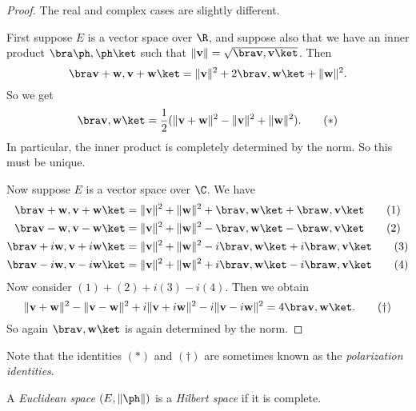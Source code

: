 \documentclass[a4paper]{article}
\begin{document}
\begin{proof}
  The real and complex cases are slightly different.

  First suppose $E$ is a vector space over $\R$, and suppose also that we have an inner product $\bra \ph,\ph\ket$ such that $\|\mathbf{v}\| = \sqrt{\bra \mathbf{v}, \mathbf{v}\ket }$. Then
  \[
    \bra \mathbf{v} + \mathbf{w}, \mathbf{v} + \mathbf{w}\ket = \|\mathbf{v}\|^2 + 2\bra \mathbf{v}, \mathbf{w}\ket + \|\mathbf{w}\|^2.
  \]
  So we get
  \[
    \bra \mathbf{v}, \mathbf{w}\ket = \frac{1}{2} (\|\mathbf{v} + \mathbf{w}\|^2 - \|\mathbf{v}\|^2 + \|\mathbf{w}\|^2).\tag{$*$}
  \]
  In particular, the inner product is completely determined by the norm. So this must be unique.

  Now suppose $E$ is a vector space over $\C$. We have
  \begin{align*}
    \bra \mathbf{v} + \mathbf{w}, \mathbf{v} + \mathbf{w}\ket &= \|\mathbf{v}\|^2 + \|\mathbf{w}\|^2 + \bra \mathbf{v}, \mathbf{w}\ket + \bra \mathbf{w}, \mathbf{v}\ket\tag{1}\\
    \bra \mathbf{v} - \mathbf{w}, \mathbf{v} - \mathbf{w}\ket &= \|\mathbf{v}\|^2 + \|\mathbf{w}\|^2 - \bra \mathbf{v}, \mathbf{w}\ket - \bra \mathbf{w}, \mathbf{v}\ket\tag{2}\\
    \bra \mathbf{v} +i\mathbf{w}, \mathbf{v} +i\mathbf{w}\ket &= \|\mathbf{v}\|^2 + \|\mathbf{w}\|^2 -i\bra \mathbf{v}, \mathbf{w}\ket +i\bra \mathbf{w}, \mathbf{v}\ket\tag{3}\\
    \bra \mathbf{v} -i\mathbf{w}, \mathbf{v} -i\mathbf{w}\ket &= \|\mathbf{v}\|^2 + \|\mathbf{w}\|^2 +i\bra \mathbf{v}, \mathbf{w}\ket -i\bra \mathbf{w}, \mathbf{v}\ket\tag{4}
  \end{align*}
  Now consider $(1) + (2) + i(3) - i(4)$. Then we obtain
  \[
    \|\mathbf{v} + \mathbf{w}\|^2 - \|\mathbf{v} - \mathbf{w}\|^2 + i\|\mathbf{v} + i\mathbf{w}\|^2 - i\|\mathbf{v} - i\mathbf{w}\|^2 = 4\bra \mathbf{v}, \mathbf{w}\ket.\tag{$\dagger$}
  \]
  So again $\bra \mathbf{v}, \mathbf{w}\ket$ is again determined by the norm.
\end{proof}
Note that the identities $(*)$ and $(\dagger)$ are sometimes known as the \emph{polarization identities}.

\begin{defi}
  A \emph{Euclidean space} $(E, \|\ph\|)$ is a \emph{Hilbert space} if it is complete.
\end{defi}
\end{document}
